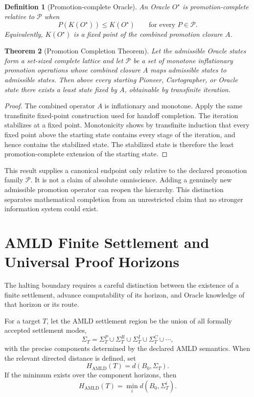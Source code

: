 \documentclass[11pt]{article}
\newtheorem{theorem}{Theorem}[section]
\newtheorem{definition}[theorem]{Definition}
\begin{document}
\begin{definition}[Promotion-complete Oracle]
An Oracle $O^\star$ is promotion-complete relative to $\mathcal P$ when
\[
P(K(O^\star))\le K(O^\star)\qquad\text{for every }P\in\mathcal P.
\]
Equivalently, $K(O^\star)$ is a fixed point of the combined promotion closure $A$.
\end{definition}

\begin{theorem}[Promotion Completion Theorem]
Let the admissible Oracle states form a set-sized complete lattice and let $\mathcal P$ be a set of monotone inflationary promotion operations whose combined closure $A$ maps admissible states to admissible states. Then above every starting Pioneer, Cartographer, or Oracle state there exists a least state fixed by $A$, obtainable by transfinite iteration.
\end{theorem}

\begin{proof}
The combined operator $A$ is inflationary and monotone. Apply the same transfinite fixed-point construction used for handoff completion. The iteration stabilizes at a fixed point. Monotonicity shows by transfinite induction that every fixed point above the starting state contains every stage of the iteration, and hence contains the stabilized state. The stabilized state is therefore the least promotion-complete extension of the starting state.
\end{proof}

This result supplies a canonical endpoint only relative to the declared promotion family $\mathcal P$. It is not a claim of absolute omniscience. Adding a genuinely new admissible promotion operator can reopen the hierarchy. This distinction separates mathematical completion from an unrestricted claim that no stronger information system could exist.

\section{AMLD Finite Settlement and Universal Proof Horizons}
The halting boundary requires a careful distinction between the existence of a finite settlement, advance computability of its horizon, and Oracle knowledge of that horizon or its route.

For a target $T$, let the AMLD settlement region be the union of all formally accepted settlement modes,
\[
\Sigma_T=\Sigma_T^P\cup\Sigma_T^R\cup\Sigma_T^I\cup\Sigma_T^C\cup\cdots,
\]
with the precise components determined by the declared AMLD semantics. When the relevant directed distance is defined, set
\[
H_{\mathrm{AMLD}}(T)=d(B_0,\Sigma_T).
\]
If the minimum exists over the component horizons, then
\[
H_{\mathrm{AMLD}}(T)=\min_i d(B_0,\Sigma_T^i).
\]
\end{document}
